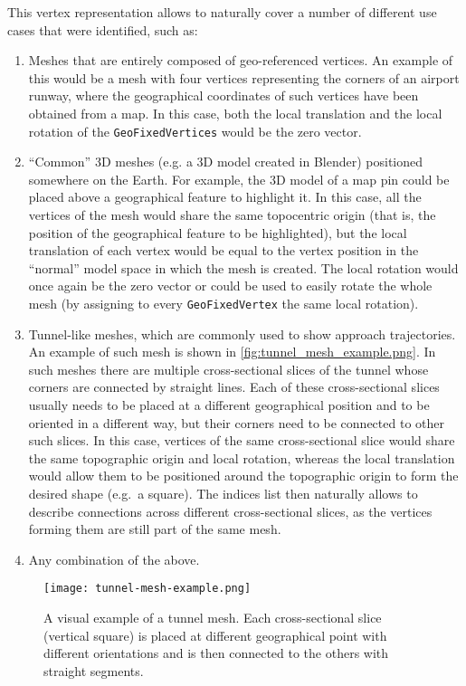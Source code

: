 This vertex representation allows to naturally cover a number of different use cases that were identified, such as:

\begin{enumerate}
    \item Meshes that are entirely composed of geo-referenced vertices. An example of this would be a mesh with four vertices representing the corners of an airport runway, where the geographical coordinates of such vertices have been obtained from a map. In this case, both the local translation and the local rotation of the \texttt{GeoFixedVertices} would be the zero vector.
    \item \enquote{Common} 3D meshes (e.g. a 3D model created in Blender) positioned somewhere on the Earth. For example, the 3D model of a map pin could be placed above a geographical feature to highlight it. In this case, all the vertices of the mesh would share the same topocentric origin (that is, the position of the geographical feature to be highlighted), but the local translation of each vertex would be equal to the vertex position in the \enquote{normal} model space in which the mesh is created. The local rotation would once again be the zero vector or could be used to easily rotate the whole mesh (by assigning to every \texttt{GeoFixedVertex} the same local rotation).
    \item Tunnel-like meshes, which are commonly used to show approach trajectories. An example of such mesh is shown in \autoref{fig:tunnel_mesh_example.png}. In such meshes there are multiple cross-sectional slices of the tunnel whose corners are connected by straight lines. Each of these cross-sectional slices usually needs to be placed at a different geographical position and to be oriented in a different way, but their corners need to be connected to other such slices. In this case, vertices of the same cross-sectional slice would share the same topographic origin and local rotation, whereas the local translation would allow them to be positioned around the topographic origin to form the desired shape (e.g.\ a square). The indices list then naturally allows to describe connections across different cross-sectional slices, as the vertices forming them are still part of the same mesh.
    \item Any combination of the above.
\end{enumerate}

\begin{figure}
  \centering
  \texttt{[image: tunnel-mesh-example.png]}
  \caption{A visual example of a tunnel mesh. Each cross-sectional slice (vertical square) is placed at different geographical point with different orientations and is then connected to the others with straight segments.}\label{fig:tunnel_mesh_example.png}
\end{figure}

